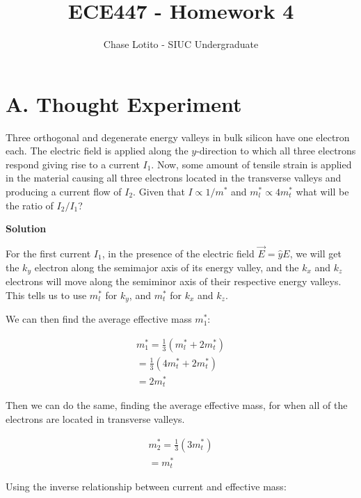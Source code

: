 \documentclass{article}
\title{ECE447 - Homework 4}
\author{Chase Lotito - SIUC Undergraduate}
\date{}
\begin{document}
\pagestyle{fancy}

\maketitle

\fancyhead{}


\section*{A. Thought Experiment}

Three orthogonal and degenerate energy valleys in bulk silicon have one electron each. The electric field is applied along the \(y\)-direction to which all three electrons respond giving rise to a current \(I_1\). Now, some amount of tensile strain is applied in the material causing all three electrons located in the transverse valleys and producing a current flow of \(I_2\). Given that \(I \propto 1/m^*\) and \(m^*_l \propto 4m^*_t\) what will be the ratio of \(I_2 / I_1\)? \bigskip

\textbf{Solution}

For the first current \(I_1\), in the presence of the electric field \(\vec{E} = \hat{y}E\), we will get the \(k_y\) electron along the semimajor axis of its energy valley, and the \(k_x\) and \(k_z\) electrons will move along the semiminor axis of their respective energy valleys. This tells us to use \(m^*_l\) for \(k_y\), and \(m^*_t\) for \(k_x\) and \(k_z\).

We can then find the average effective mass \(m^*_1\):

\begin{align*}
    m^*_1 = \frac{1}{3} ( m^*_l + 2m^*_t ) \\
    = \frac{1}{3} ( 4m^*_t + 2m^*_t ) \\
    = 2m^*_t
\end{align*}

Then we can do the same, finding the average effective mass, for when all of the electrons are located in transverse valleys.

\begin{align*}
    m^*_2 = \frac{1}{3} ( 3m^*_t ) \\
    = m^*_t
\end{align*}

Using the inverse relationship between current and effective mass:
\end{document}
